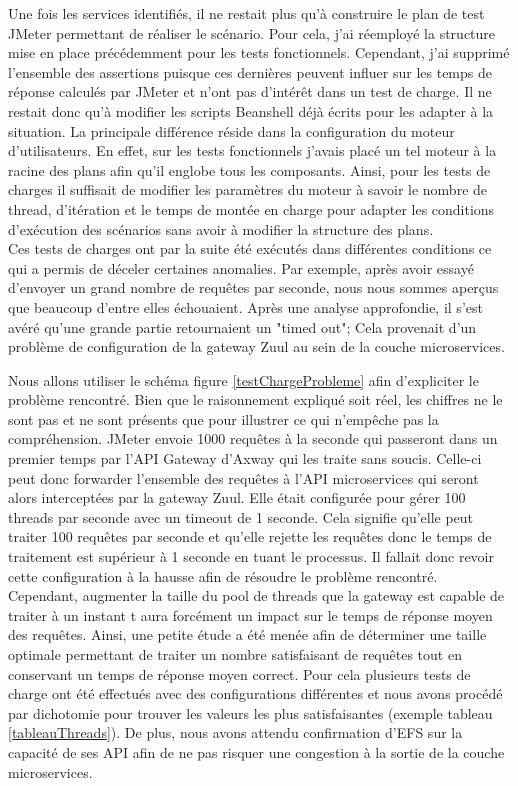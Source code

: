 	Une fois les services identifiés, il ne restait plus qu'à construire le plan de test JMeter permettant de réaliser le scénario. Pour cela, j'ai réemployé la structure mise en place précédemment pour les tests fonctionnels. Cependant, j'ai supprimé l'ensemble des assertions puisque ces dernières peuvent influer sur les temps de réponse calculés par JMeter et n'ont pas d'intérêt dans un test de charge. Il ne restait donc qu'à modifier les scripts Beanshell déjà écrits pour les adapter à la situation. La principale différence réside dans la configuration du moteur d'utilisateurs. En effet, sur les tests fonctionnels j'avais placé un tel moteur à la racine des plans afin qu'il englobe tous les composants. Ainsi, pour les tests de charges il suffisait de modifier les paramètres du moteur à savoir le nombre de thread, d'itération et le temps de montée en charge pour adapter les conditions d'exécution des scénarios sans avoir à modifier la structure des plans. \\
	
	Ces tests de charges ont par la suite été exécutés dans différentes conditions ce qui a permis de déceler certaines anomalies. Par exemple, après avoir essayé d'envoyer un grand nombre de requêtes par seconde, nous nous sommes aperçus que beaucoup d'entre elles échouaient. Après une analyse approfondie, il s'est avéré qu'une grande partie retournaient un "timed out"; Cela provenait d'un problème de configuration de la gateway Zuul au sein de la couche microservices.
	
	Nous allons utiliser le schéma figure \ref{testChargeProbleme} afin d'expliciter le problème rencontré. Bien que le raisonnement expliqué soit réel, les chiffres ne le sont pas et ne sont présents que pour illustrer ce qui n'empêche pas la compréhension. JMeter envoie 1000 requêtes à la seconde qui passeront dans un premier temps par l'API Gateway d'Axway qui les traite sans soucis. Celle-ci peut donc forwarder l'ensemble des requêtes à l'API microservices qui seront alors interceptées par la gateway Zuul. Elle était configurée pour gérer 100 threads par seconde avec un timeout de 1 seconde. Cela signifie qu'elle peut traiter 100 requêtes par seconde et qu'elle rejette les requêtes donc le temps de traitement est supérieur à 1 seconde en tuant le processus. Il fallait donc revoir cette configuration à la hausse afin de résoudre le problème rencontré. Cependant, augmenter la taille du pool de threads que la gateway est capable de traiter à un instant t aura forcément un impact sur le temps de réponse moyen des requêtes. Ainsi, une petite étude a été menée afin de déterminer une taille optimale permettant de traiter un nombre satisfaisant de requêtes tout en conservant un temps de réponse moyen correct. Pour cela plusieurs tests de charge ont été effectués avec des configurations différentes et nous avons procédé par dichotomie pour trouver les valeurs les plus satisfaisantes (exemple tableau \ref{tableauThreads}). De plus, nous avons attendu confirmation d'EFS sur la capacité de ses API afin de ne pas risquer une congestion à la sortie de la couche microservices.
	
